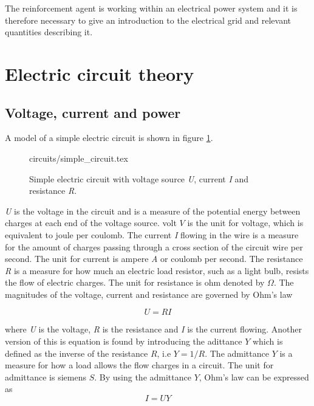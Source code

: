 \documentclass[class=book, crop=false]{standalone}
\begin{document}
The reinforcement agent is working within an electrical power system and it is therefore necessary to give an introduction to the electrical grid and relevant quantities describing it. 

\section{Electric circuit theory}
\subsection{Voltage, current and power}
A model of a simple electric circuit is shown in figure \ref{fig:theory:simple_circuit}.

\begin{figure}[ht!]
    \centering
    {circuits/simple_circuit.tex}
    \caption{Simple electric circuit with voltage source \textit{U}, current \textit{I} and resistance \textit{R}.}
    \label{fig:theory:simple_circuit}
\end{figure}




\textit{U} is the voltage in the circuit and is a measure of the potential energy between charges at each end of the voltage source. volt $V$ is the unit for voltage, which is equivalent to joule per coulomb. The current \textit{I} flowing in the wire is a measure for the amount of charges passing through a cross section of the circuit wire per second. The unit for current is ampere \textit{A} or coulomb per second. The resistance \textit{R} is a measure for how much an electric load resistor, such as a light bulb, resists the flow of electric charges. The unit for resistance is ohm denoted by $\Omega$. The magnitudes of the voltage, current and resistance are governed by Ohm's law

\begin{equation}\label{eq:theory:ohm_simple}
    U = RI
\end{equation}

where  \textit{U} is the voltage, \textit{R} is the resistance and \textit{I} is the current flowing. Another version of this is equation is found by introducing the adittance $Y$ which is defined as the inverse of the resistance $R$, i.e  $Y = 1/R$. The admittance $Y$ is a measure for how a load allows the flow charges in a circuit. The unit for admittance is siemens $S$. By using the admittance $Y$, Ohm's law can be expressed as
\begin{equation}\label{eq:theory:ohm_simple_inverse}
    I = UY
\end{equation}
\end{document}
